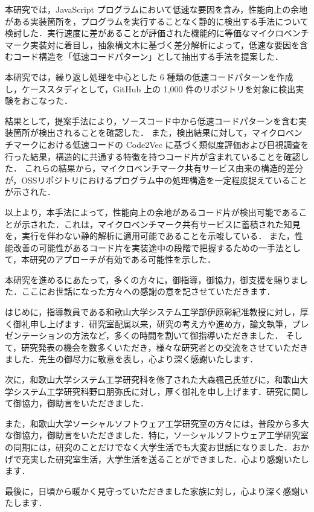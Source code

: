 \documentclass[11pt]{jreport}
\begin{document}
本研究では，JavaScript プログラムにおいて低速な要因を含み，性能向上の余地がある実装箇所を，プログラムを実行することなく静的に検出する手法について検討した．実行速度に差があることが評価された機能的に等価なマイクロベンチマーク実装対に着目し，抽象構文木に基づく差分解析によって，低速な要因を含むコード構造を「低速コードパターン」として抽出する手法を提案した．

本研究では，繰り返し処理を中心とした 6 種類の低速コードパターンを作成し，ケーススタディとして，GitHub 上の 1,000 件のリポジトリを対象に検出実験をおこなった．

結果として，提案手法により，ソースコード中から低速コードパターンを含む実装箇所が検出されることを確認した．
また，検出結果に対して，マイクロベンチマークにおける低速コードの Code2Vec に基づく類似度評価および目視調査を行った結果，構造的に共通する特徴を持つコード片が含まれていることを確認した．
これらの結果から，マイクロベンチマーク共有サービス由来の構造的差分が，OSSリポジトリにおけるプログラム中の処理構造を一定程度捉えていることが示された．

以上より，本手法によって，性能向上の余地があるコード片が検出可能であることが示された．これは，マイクロベンチマーク共有サービスに蓄積された知見を，実行を伴わない静的解析に適用可能であることを示唆している．
また，性能改善の可能性があるコード片を実装途中の段階で把握するための一手法として，本研究のアプローチが有効である可能性を示した．



\begin{acknowledgements}
本研究を進めるにあたって，多くの方々に，御指導，御協力，御支援を賜りました．ここにお世話になった方々への感謝の意を記させていただきます．

はじめに，指導教員である和歌山大学システム工学部伊原彰紀准教授に対し，厚く御礼申し上げます．研究室配属以来，研究の考え方や進め方，論文執筆，プレゼンテーションの方法など，多くの時間を割いて御指導いただきました．
そして，研究発表の機会を数多くいただき，様々な研究者との交流をさせていただきました．先生の御尽力に敬意を表し，心より深く感謝いたします．

次に，和歌山大学システム工学研究科を修了された大森楓己氏並びに，和歌山大学システム工学研究科野口朋弥氏に対し，厚く御礼を申し上げます．研究に関して御協力，御助言をいただきました．

また，和歌山大学ソーシャルソフトウェア工学研究室の方々には，普段から多大な御協力，御助言をいただきました．特に，ソーシャルソフトウェア工学研究室の同期には，研究のことだけでなく大学生活でも大変お世話になりました．おかげで充実した研究室生活，大学生活を送ることができました．心より感謝いたします．

最後に，日頃から暖かく見守っていただきました家族に対し，心より深く感謝いたします．
\end{acknowledgements}
\end{document}
